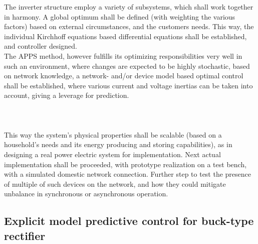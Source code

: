 		The inverter structure employ a variety of subsystems, which shall work together in harmony. A global optimum shall be defined (with weighting the various factors) based on external circumstances, and the customers needs. This way, the individual Kirchhoff equations based differential equations shall be established, and controller designed.\\
		The APPS method, however fulfills its optimizing responsibilities very well in such an environment, where changes are expected to be highly stochastic, based on network knowledge, a network- and/or device model based optimal control shall be established, where various current and voltage inertias can be taken into account, giving a leverage for prediction.\\
        \\
        \\
        \\
        This way the system's physical properties shall be scalable (based on a household's needs and its energy producing and storing capabilities), as in designing a real power electric system for implementation. Next actual implementation shall be proceeded, with prototype realization on a test bench, with a simulated domestic network connection. Further step to test the presence of multiple of such devices on the network, and how they could mitigate unbalance in synchronous or asynchronous operation. \\

		
		\subsection{Explicit model predictive control for buck-type rectifier}
		
